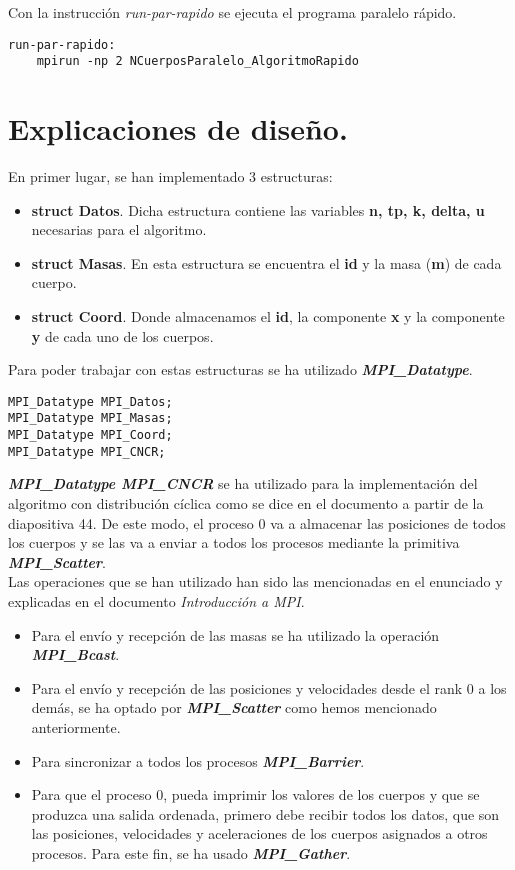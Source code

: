 \documentclass[11pt]{article}
\begin{document}
Con la instrucción \textit{run-par-rapido} se ejecuta el programa paralelo rápido.
\begin{lstlisting}[style=C,numbers=none]
run-par-rapido:
	mpirun -np 2 NCuerposParalelo_AlgoritmoRapido
\end{lstlisting}


\newpage
\section{Explicaciones de diseño.}
En primer lugar, se han implementado 3 estructuras:
\begin{itemize}
	\item \textbf{struct Datos}. Dicha estructura contiene las variables \textbf{n, tp, k, delta, u} necesarias para el algoritmo.
	
	\item \textbf{struct Masas}. En esta estructura se encuentra el \textbf{id} y la masa (\textbf{m}) de cada cuerpo.
	
	\item \textbf{struct Coord}. Donde almacenamos el \textbf{id}, la componente \textbf{x} y la componente \textbf{y} de cada uno de los cuerpos.
\end{itemize}

Para poder trabajar con estas estructuras se ha utilizado \textbf{\textit{MPI\_Datatype}}.
\begin{lstlisting}[style=C,numbers=none]
MPI_Datatype MPI_Datos;
MPI_Datatype MPI_Masas;
MPI_Datatype MPI_Coord;
MPI_Datatype MPI_CNCR;
\end{lstlisting}
\textbf{\textit{MPI\_Datatype MPI\_CNCR}} se ha utilizado para la implementación del algoritmo con distribución cíclica como se dice en el documento a partir de la diapositiva 44. De este modo, el proceso 0 va a almacenar las posiciones de todos los cuerpos y se las va a enviar a todos los procesos mediante la primitiva \textbf{\textit{MPI\_Scatter}}. \\

Las operaciones que se han utilizado han sido las mencionadas en el enunciado y explicadas en el documento \textit{Introducción a MPI}. \\
\begin{itemize}
	\item Para el envío y recepción de las masas se ha utilizado la operación \textbf{\textit{MPI\_Bcast}}.
	\item Para el envío y recepción de las posiciones y velocidades desde el rank 0 a los demás, se ha optado por 						\textbf{\textit{MPI\_Scatter}} como hemos mencionado anteriormente.
	\item Para sincronizar a todos los procesos \textbf{\textit{MPI\_Barrier}}.
	\item Para que el proceso 0, pueda imprimir los valores de los cuerpos y que se produzca una salida ordenada, primero debe 			recibir todos los datos, que son las posiciones, velocidades y aceleraciones de los cuerpos asignados a otros procesos. Para este fin, se 	ha usado \textbf{\textit{MPI\_Gather}}.
\end{itemize}
\end{document}
